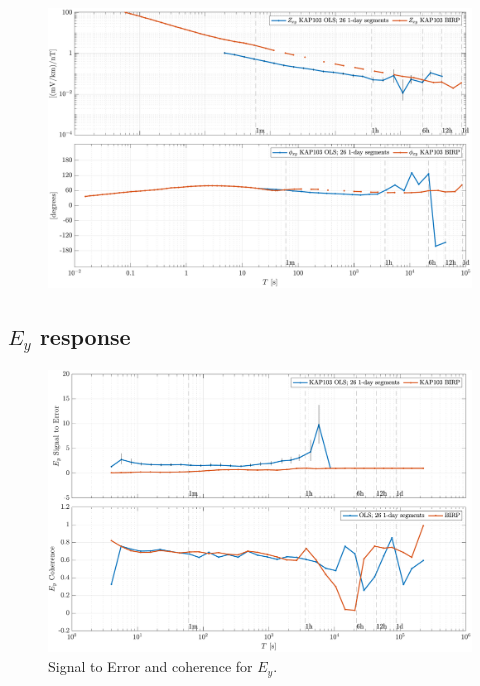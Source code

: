 \documentclass{article}
\begin{document}
\clearpage

\begin{figure}[h!]
\centering
\includegraphics[width=\textwidth]{figures/KAP103/transferfnZ_compare-Z_xy_Magnitude_Phase.pdf}
\caption{}
\label{fig:universe}
\end{figure}

\clearpage

\subsection{$E_y$ response}

\begin{figure}[h!]
\centering
\includegraphics[width=\textwidth]{figures/KAP103/SN_compare-E_y.pdf}
\caption{Signal to Error and coherence for $E_y$.}
\label{fig:universe}
\end{figure}

\clearpage
\end{document}

